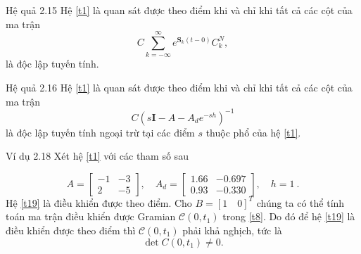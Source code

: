 \documentclass[10pt,notheorems]{beamer}
\theoremstyle{definition}
\theoremstyle{definition}
\theoremstyle{definition}
\begin{document}
\begin{frame}{}
	\begin{block}{Hệ quả 2.15}
		Hệ \eqref{t1} là quan sát được theo điểm khi và chỉ khi tất cả các cột của ma trận
		\begin{equation}\label{t17}
		C\sum\limits^\infty_{k=-\infty}e^{\mathbf{S}_k(t-0)}C^N_k,
		\end{equation}	
		là độc lập tuyến tính.
	\end{block}
	
	\begin{block}{Hệ quả 2.16}
		Hệ \eqref{t1} là quan sát được theo điểm khi và chỉ khi tất cả các cột của ma trận
		\begin{equation}\label{t18}
		C(s\mathbf{I}-A-A_de^{-sh})^{-1}
		\end{equation}
		là độc lập tuyến tính ngoại trừ tại các điểm $s$ thuộc phổ của hệ \eqref{t1}.
	\end{block}
\end{frame}
%
\begin{frame}{}
\begin{block}{Ví dụ 2.18}
	Xét hệ \eqref{t1} với các tham số sau
		
	\begin{equation}\label{t19}
	A=\begin{bmatrix}
	-1 & -3\\
	2 & -5
	\end{bmatrix},\quad
	A_d=\begin{bmatrix}
	1.66 & -0.697\\
	0.93 & -0.330
	\end{bmatrix},\quad h=1 \ .
	\end{equation}
	Hệ \eqref{t19} là điều khiển được theo điểm. Cho $B=[1\quad 0]^T$ chúng ta có thể tính toán ma trận điều khiển được Gramian $\mathcal{C}(0,t_1)$ trong \eqref{t8}. 
	Do đó để hệ \eqref{t19} là điều khiển được theo điểm thì $\mathcal{C}(0,t_1)$ phải khả nghịch, tức là 
	\begin{equation}\label{t20}
	\det C(0,t_1) \not= 0.
	\end{equation} 
\end{block}   
\end{frame}
\end{document}
